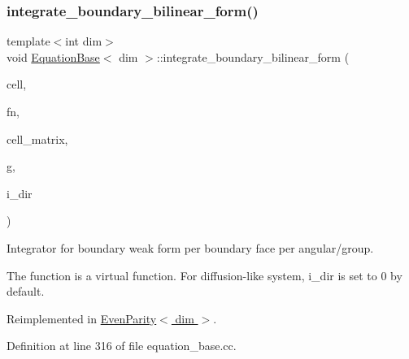 \mbox{\label{class_equation_base_ae294806284f671619cac9e7169ffff8d}} 
\subsubsection{\texorpdfstring{integrate\+\_\+boundary\+\_\+bilinear\+\_\+form()}{integrate\_boundary\_bilinear\_form()}}
{\footnotesize\ttfamily template$<$int dim$>$ \\
void \hyperlink{class_equation_base}{Equation\+Base}$<$ dim $>$\+::integrate\+\_\+boundary\+\_\+bilinear\+\_\+form (\begin{DoxyParamCaption}\item[{typename Do\+F\+Handler$<$ dim $>$\+::active\+\_\+cell\+\_\+iterator \&}]{cell,  }\item[{unsigned int \&}]{fn,  }\item[{Full\+Matrix$<$ double $>$ \&}]{cell\+\_\+matrix,  }\item[{const unsigned int \&}]{g,  }\item[{const unsigned int \&}]{i\+\_\+dir }\end{DoxyParamCaption})\hspace{0.3cm}{\ttfamily [virtual]}}



Integrator for boundary weak form per boundary face per angular/group. 

The function is a virtual function. For diffusion-\/like system, i\+\_\+dir is set to 0 by default. 

Reimplemented in \hyperlink{class_even_parity_ae800cb49f85cf417167ca5385b50df6f}{Even\+Parity$<$ dim $>$}.



Definition at line 316 of file equation\+\_\+base.\+cc.

\mbox{\label{class_equation_base_a1a213c4e21984bead9146e50be97077f}} 
